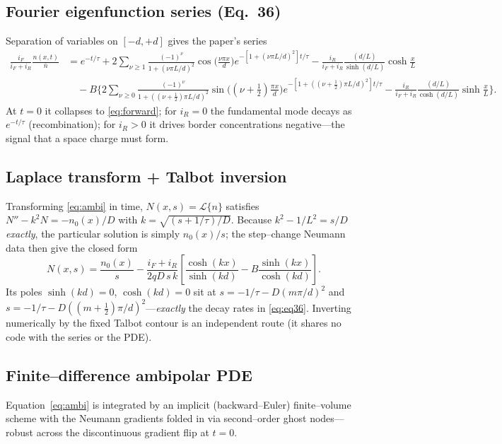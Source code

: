 \documentclass[11pt]{article}
\begin{document}
\subsection{Fourier eigenfunction series (Eq.~36)}
Separation of variables on $[-d,+d]$ gives the paper's series
\begin{align}\label{eq:eq36}
\frac{i_F}{i_F+i_R}\frac{n(x,t)}{\bar n}
&= e^{-t/\tau}
+ 2\sum_{\nu\ge1}\frac{(-1)^\nu}{1+(\nu\pi L/d)^2}
\cos\!\Big(\tfrac{\nu\pi x}{d}\Big)
e^{-[1+(\nu\pi L/d)^2]t/\tau}
- \frac{i_R}{i_F+i_R}\frac{(d/L)}{\sinh(d/L)}\cosh\tfrac{x}{L}\nonumber\\
&\quad - B\Bigg\{2\sum_{\nu\ge0}
\frac{(-1)^\nu}{1+((\nu+\tfrac12)\pi L/d)^2}
\sin\!\Big((\nu+\tfrac12)\tfrac{\pi x}{d}\Big)
e^{-[1+((\nu+\frac12)\pi L/d)^2]t/\tau}
- \frac{i_R}{i_F+i_R}\frac{(d/L)}{\cosh(d/L)}\sinh\tfrac{x}{L}\Bigg\}.
\end{align}
At $t=0$ it collapses to \eqref{eq:forward}; for $i_R=0$ the fundamental mode
decays as $e^{-t/\tau}$ (recombination); for $i_R>0$ it drives border
concentrations negative---the signal that a space charge must form.

\subsection{Laplace transform + Talbot inversion}
Transforming \eqref{eq:ambi} in time, $N(x,s)=\mathcal L\{n\}$ satisfies
$N''-k^2N=-n_0(x)/D$ with $k=\sqrt{(s+1/\tau)/D}$. Because
$k^2-1/L^2=s/D$ \emph{exactly}, the particular solution is simply $n_0(x)/s$;
the step--change Neumann data then give the closed form
\begin{equation}\label{eq:laplace}
N(x,s)=\frac{n_0(x)}{s}
-\frac{i_F+i_R}{2qD\,s\,k}
\left[\frac{\cosh(kx)}{\sinh(kd)}-B\frac{\sinh(kx)}{\cosh(kd)}\right].
\end{equation}
Its poles $\sinh(kd)=0$, $\cosh(kd)=0$ sit at
$s=-1/\tau-D(m\pi/d)^2$ and $s=-1/\tau-D((m+\tfrac12)\pi/d)^2$---\emph{exactly}
the decay rates in \eqref{eq:eq36}. Inverting numerically by the fixed Talbot
contour is an independent route (it shares no code with the series or the PDE).

\subsection{Finite--difference ambipolar PDE}
Equation~\eqref{eq:ambi} is integrated by an implicit (backward--Euler)
finite--volume scheme with the Neumann gradients folded in via second--order
ghost nodes---robust across the discontinuous gradient flip at $t=0$.
\end{document}

